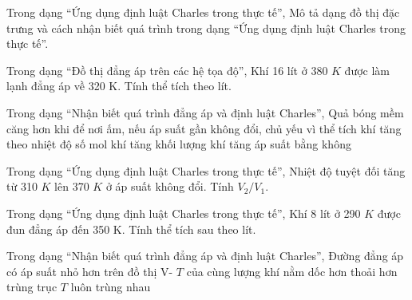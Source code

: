 \begin{ex}
Trong dạng “Ứng dụng định luật Charles trong thực tế”, Mô tả dạng đồ thị đặc trưng và cách nhận biết quá trình trong dạng “Ứng dụng định luật Charles trong thực tế”.
\choiceTF

\end{ex}

\begin{ex}
Trong dạng “Đồ thị đẳng áp trên các hệ tọa độ”, Khí 16 lít ở 380 $K$ được làm lạnh đẳng áp về 320 K. Tính thể tích theo lít.
\end{ex}

\begin{ex}
Trong dạng “Nhận biết quá trình đẳng áp và định luật Charles”, Quả bóng mềm căng hơn khi để nơi ấm, nếu áp suất gần không đổi, chủ yếu vì
\choice
{\True thể tích khí tăng theo nhiệt độ}
{số mol khí tăng}
{khối lượng khí tăng}
{áp suất bằng không}
\end{ex}

\begin{bt}
Trong dạng “Ứng dụng định luật Charles trong thực tế”, Nhiệt độ tuyệt đối tăng từ 310 $K$ lên 370 $K$ ở áp suất không đổi. Tính $V_2/V_1$.
\end{bt}

\begin{ex}
Trong dạng “Ứng dụng định luật Charles trong thực tế”, Khí 8 lít ở 290 $K$ được đun đẳng áp đến 350 K. Tính thể tích sau theo lít.
\end{ex}

\begin{ex}
Trong dạng “Nhận biết quá trình đẳng áp và định luật Charles”, Đường đẳng áp có áp suất nhỏ hơn trên đồ thị V- $T$ của cùng lượng khí nằm
\choice
{\True dốc hơn}
{thoải hơn}
{trùng trục $T$}
{luôn trùng nhau}
\end{ex}

